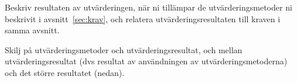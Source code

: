 Beskriv resultaten av utvärderingen, när ni tillämpar de ut\-vär\-de\-rings\-me\-to\-der ni beskrivit i avsnitt~\ref{sec:krav}, och relatera utvärderingsresultaten till kraven i samma avsnitt.

Skilj på utvärderingsmetoder och utvärderingsresultat, och mellan utvärderingsresultat (dvs resultat av användningen av utvärderingsmetoderna) och det större resultatet (nedan).

